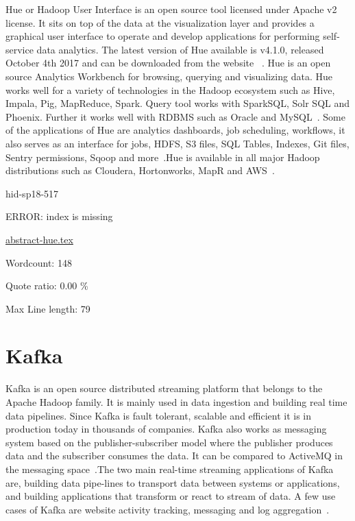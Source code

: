Hue or Hadoop User Interface is an open source tool licensed under Apache v2
license. It sits on top of the data at the visualization layer and provides a
graphical user interface to operate and develop applications for performing
self-service data analytics.  The latest version of Hue available is v4.1.0,
released October 4th 2017 and can be downloaded from the website
~\cite{hid-sp18-517-hue-apache}. Hue is an open source Analytics Workbench for
browsing, querying and visualizing data. Hue works well for a variety of
technologies in the Hadoop ecosystem such as Hive, Impala, Pig, MapReduce,
Spark. Query tool works with SparkSQL, Solr SQL and Phoenix. Further it works
well with RDBMS such as Oracle and MySQL~\cite{hid-sp18-517-Hue-wiki}. Some of
the applications of Hue are analytics dashboards, job scheduling, workflows, it
also serves as an interface for jobs, HDFS, S3 files, SQL Tables, Indexes, Git
files, Sentry permissions, Sqoop and more~\cite{hid-sp18-517-Hue-wiki}.Hue is
available in all major Hadoop distributions such as Cloudera, Hortonworks, MapR
and AWS~\cite{hid-sp18-517-Hue-wiki}.


\begin{IU}

hid-sp18-517

ERROR: index is missing

\href{https://github.com/cloudmesh-community/hid-sp18-517/blob/master//technology/abstract-hue.tex}{abstract-hue.tex}

 

Wordcount: 148


Quote ratio: 0.00 \%
 
Max Line length: 79
\end{IU}

\section{Kafka}

Kafka is an open source distributed streaming platform that belongs 
to the Apache Hadoop family. It is mainly used in data ingestion and 
building real time data pipelines. Since Kafka is fault tolerant, 
scalable and efficient it is in production today in thousands of 
companies. Kafka also works as messaging system based on the 
publisher-subscriber model where the publisher produces data and 
the subscriber consumes the data. It can be compared to ActiveMQ 
in the messaging space~\cite{hid-sp18-517-ApacheKafka}.The two main
real-time streaming applications of Kafka are, building  data
pipe-lines to transport data between systems or applications, and
building applications that transform or react to stream of data. A few
use cases of Kafka are website activity tracking, messaging 
and log aggregation~\cite{hid-sp18-517-ApacheKafka}.



